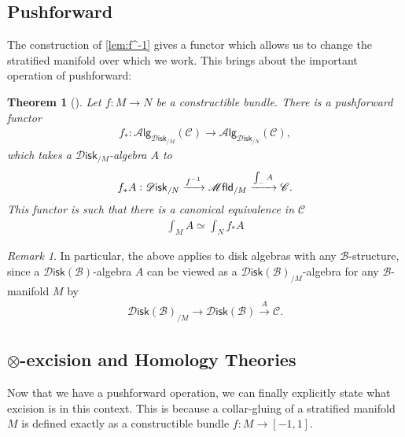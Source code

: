 \documentclass[12pt,a4paper]{article}
\newcounter{counter} \numberwithin{counter}{section}
\theoremstyle{definition}
\theoremstyle{plain}
\newtheorem{theorem}[counter]{Theorem}
\theoremstyle{remark}
\newtheorem{remark}[counter]{Remark}
\newcommand{\catC}{\mathscr{C}}
\newcommand{\mfld}[1][s]{%
    \ifx r#1\mathsf{Mfld}\else
    \ifx s#1\mathscr{M} \mathsf{fld}\else
    \mathrm{Illegal~option}%
    \fi\fi
}
\newcommand{\disk}{\mathscr{D} \mathsf{isk}}
\newcommand{\alg}[1]{\mathscr{A} \mathsf{lg}_{#1}}
\newcommand{\bstr}{\mathscr{B}}
\begin{document}
\subsection{Pushforward}

The construction of \cref{lem:f^-1} gives a functor which allows us to change the stratified manifold over which we work. This brings about the important operation of pushforward:

\begin{theorem}[{\cite[thm.2.25]{aft_fhstrat}}]\label{thm:fh_pushforward}
    Let $f: M \rightarrow N$ be a constructible bundle. There is a pushforward functor
    \begin{align}
        f_*: \alg{\disk_{/M}}(\catC) \xrightarrow{\quad} \alg{\disk_{/N}}(\catC),
    \end{align}
    which takes a $\disk_{/M}$-algebra $A$ to
    \begin{align}
        f_*A: \disk_{/N} \xrightarrow{f^{-1}} \mfld_{/M} \xrightarrow{\int_{-} A} \catC.
    \end{align}
    This functor is such that there is a canonical equivalence in $\catC$
    \begin{align}
        \int_{M} A \simeq \int_{N} f_* A
    \end{align}
\end{theorem}


\begin{remark}
    In particular, the above applies to disk algebras with any $\bstr$-structure, since a $\disk(\bstr)$-algebra $A$ can be viewed as a $\disk(\bstr)_{/M}$-algebra for any $\bstr$-manifold $M$ by
    \begin{align}
        \disk(\bstr)_{/M} \rightarrow \disk(\bstr) \xrightarrow{A} \catC.
    \end{align}
\end{remark}






\subsection{\texorpdfstring{$\otimes$}{tensor}-excision and Homology Theories}

Now that we have a pushforward operation, we can finally explicitly state what excision is in this context. This is because a collar-gluing of a stratified manifold $M$ is defined exactly as a constructible bundle $f: M \rightarrow [-1,1]$.
\end{document}
